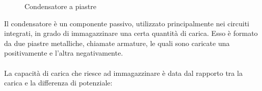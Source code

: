 \def\dph{0.3} %
\def\dpw{0.1} %
\def\dipole#1{
  \begin{scope}[shift={(#1)}]
    \draw[charge-] (-\dph,0) to[out=90,in=180] (0,\dpw) -- (0,-\dpw) to[out=180,in=-90] cycle;
    \draw[charge+] ( \dph,0) to[out=90,in=0] (0,\dpw) -- (0,-\dpw) to[out=  0,in=-90] cycle;
    \node[scale=0.7] at (-\dph/2,0) {$-$};
    \node[scale=0.7] at ( \dph/2,0) {$+$};
  \end{scope}
}

\def\height{5}
\def\width{3}
\def\platewidth{0.5}
\def\dielwidth{0.13*\width}
\def\nfieldlines{6}
\def\ncharges{7}
\begin{figure}[H]
    \centering
{}
    \caption{Condensatore a piastre}
    \label{fig:condensatorePiastre}
\end{figure}

Il condensatore è un componente passivo, utilizzato principalmente nei circuiti integrati, in grado di immagazzinare una certa quantità di carica. Esso è formato da due piastre metalliche, chiamate armature, le quali sono caricate una positivamente e l'altra negativamente.
\paragraph{}
La capacità di carica che riesce ad immagazzinare è data  dal rapporto tra la carica e la differenza di potenziale:

